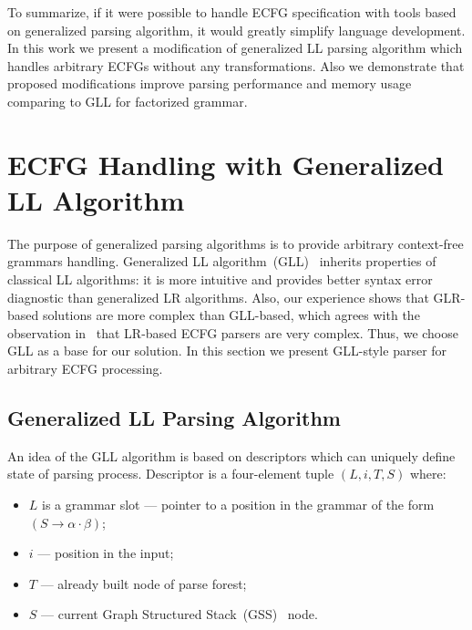 \documentclass[runningheads,a4paper]{llncs}
\begin{document}
To summarize, if it were possible to handle ECFG specification with tools based on generalized parsing algorithm, it would greatly simplify language development.
In this work we present a modification of generalized LL parsing algorithm which handles arbitrary ECFGs without any transformations.
Also we demonstrate that proposed modifications improve parsing performance and memory usage comparing to GLL for factorized grammar.

\section{ECFG Handling with Generalized LL Algorithm}%

The purpose of generalized parsing algorithms is to provide arbitrary context-free grammars handling.
Generalized LL algorithm~(GLL)~\cite{scott2010gll} inherits properties of classical LL algorithms: it is more intuitive and provides better syntax error diagnostic than generalized LR algorithms.
Also, our experience shows that GLR-based solutions are more complex than GLL-based, which agrees with the observation in~\cite{ECFG} that LR-based ECFG parsers are very complex. 
Thus, we choose GLL as a base for our solution.
In this section we present GLL-style parser for arbitrary ECFG processing.

\subsection{Generalized LL Parsing Algorithm}%

An idea of the GLL algorithm is based on descriptors which can uniquely define state of parsing process.
Descriptor is a four-element tuple $(L, i, T, S)$ where: 
\begin{itemize}
\item $L$ is a grammar slot --- pointer to a position in the grammar of the form~$(S \to \alpha \cdot \beta)$;
\item $i$ --- position in the input;
\item $T$ --- already built node of parse forest;
\item $S$ --- current Graph Structured Stack~(GSS)~\cite{afroozeh2015faster} node.
\end{itemize}
\end{document}
